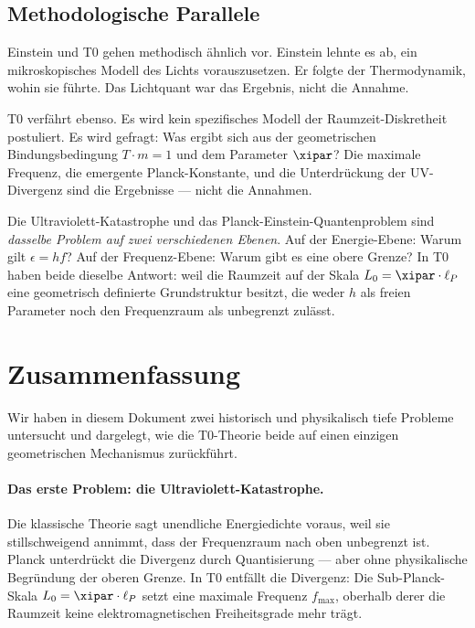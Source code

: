 \subsection{Methodologische Parallele}

Einstein und T0 gehen methodisch ähnlich vor. 
Einstein lehnte es ab, ein mikroskopisches Modell des Lichts vorauszusetzen. 
Er folgte der Thermodynamik, wohin sie führte. Das Lichtquant war das Ergebnis, 
nicht die Annahme.

T0 verfährt ebenso. Es wird kein spezifisches Modell der Raumzeit-Diskretheit 
postuliert. Es wird gefragt: Was ergibt sich aus der geometrischen Bindungsbedingung 
$T \cdot m = 1$ und dem Parameter $\xipar$? Die maximale Frequenz, die emergente 
Planck-Konstante, und die Unterdrückung der UV-Divergenz sind die Ergebnisse — 
nicht die Annahmen.

\begin{revolutionary}
    Die Ultraviolett-Katastrophe und das Planck-Einstein-Quantenproblem sind 
    \emph{dasselbe Problem auf zwei verschiedenen Ebenen}. Auf der Energie-Ebene: 
    Warum gilt $\epsilon = hf$? Auf der Frequenz-Ebene: Warum gibt es eine obere 
    Grenze? In T0 haben beide dieselbe Antwort: weil die Raumzeit auf der Skala 
    $L_0 = \xipar \cdot \ell_P$ eine geometrisch definierte Grundstruktur besitzt, 
    die weder $h$ als freien Parameter noch den Frequenzraum als unbegrenzt zulässt.
\end{revolutionary}

\clearpage

\section{Zusammenfassung}
\label{sec:summary}

Wir haben in diesem Dokument zwei historisch und physikalisch tiefe Probleme untersucht 
und dargelegt, wie die T0-Theorie beide auf einen einzigen geometrischen Mechanismus 
zurückführt.

\paragraph{Das erste Problem: die Ultraviolett-Katastrophe.}
Die klassische Theorie sagt unendliche Energiedichte voraus, weil sie stillschweigend 
annimmt, dass der Frequenzraum nach oben unbegrenzt ist. Planck unterdrückt die 
Divergenz durch Quantisierung — aber ohne physikalische Begründung der oberen 
Grenze. In T0 entfällt die Divergenz: Die Sub-Planck-Skala 
$L_0 = \xipar \cdot \ell_P$ setzt eine maximale Frequenz $f_{\max}$, oberhalb derer 
die Raumzeit keine elektromagnetischen Freiheitsgrade mehr trägt.

